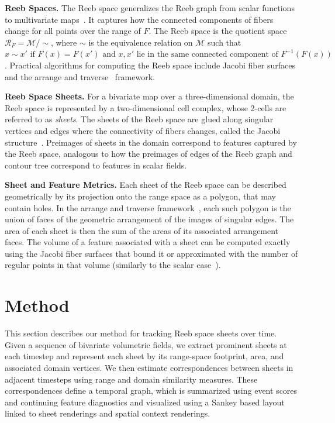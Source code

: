 \documentclass[review]{vgtc}                          %
\newcommand{\Domain}{\mathcal{M}}
\newcommand{\myparagraph}[1]{\vspace{1mm} \noindent \textbf{#1}}
\newcommand{\Talha}[1]{\textcolor{magenta}{Talha: #1}\xspace}
\begin{document}
\myparagraph{Reeb Spaces.} The Reeb space generalizes the Reeb graph from scalar functions to multivariate maps~\cite{Edelsbrunner2008}.
It captures how the connected components of fibers change for all points over the range of $F$.
The Reeb space is the quotient space $\mathcal{R}_F = \Domain/\sim$, where $\sim$ is the equivalence relation on $\Domain$ such that $x\sim x' \text{ if } F(x) = F(x') \text{ and }
x, x' \text{ lie in the same connected component of } F^{-1}(F(x))$.
Practical algorithms for computing the Reeb space include Jacobi fiber surfaces~\cite{Tierny2017b} and the arrange and traverse~\cite{hristov2025, Hristov2026SingularAA} framework.

\myparagraph{Reeb Space Sheets.} 
For a bivariate map over a three-dimensional domain, the Reeb space is represented by a two-dimensional cell complex, whose 2-cells are referred to as \textit{sheets}.
The sheets of the Reeb space are glued along singular vertices and edges where the connectivity of fibers changes, called the Jacobi structure~\cite{Chattopadhyay2014}.
Preimages of sheets in the domain correspond to features captured by the Reeb space, analogous to how the preimages of edges of the Reeb graph and contour tree correspond to features in scalar fields.

\myparagraph{Sheet and Feature Metrics.}
Each sheet of the Reeb space can be described geometrically by its projection onto the range space as a polygon, that may contain holes.  %
In the arrange and traverse framework~\cite{hristov2025, Hristov2026SingularAA}, each such polygon is the union of faces of the geometric arrangement of the images of singular edges. 
The area of each sheet is then the sum of the areas of its associated arrangement faces.
The volume of a feature associated with a sheet can be computed exactly using the Jacobi fiber surfaces that bound it or approximated with the number of regular points in that volume (similarly to the scalar case~\cite{Schneider2008}).

\section{Method}

This section describes our method for tracking Reeb space sheets over time. Given a sequence of bivariate volumetric fields, we extract prominent sheets at each timestep and represent each sheet by its range-space footprint, area, and associated domain vertices. We then estimate correspondences between sheets in adjacent timesteps using range and domain similarity measures. These correspondences define a temporal graph, which is summarized using event scores and continuing feature diagnostics and visualized using a Sankey based layout linked to sheet renderings and spatial context renderings.
\end{document}
